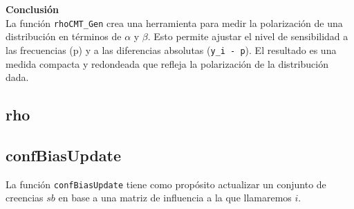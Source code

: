 \documentclass{article}
\begin{document}
	\textbf{Conclusión}\\

	La función \texttt{rhoCMT\_Gen} crea una herramienta para medir la polarización de una distribución en términos de $\alpha$ y $\beta$. Esto permite ajustar el nivel de sensibilidad a las frecuencias (p) y a las diferencias absolutas (\texttt{y\_i - p}). El resultado es una medida compacta y redondeada que refleja la polarización de la distribución dada.


    \subsection{rho}

\subsection{confBiasUpdate}
	
	La función \texttt{confBiasUpdate} tiene como propósito actualizar un conjunto de creencias $sb$ en base a una matriz de influencia a la que llamaremos $i$.
  \\
  
\end{document}
